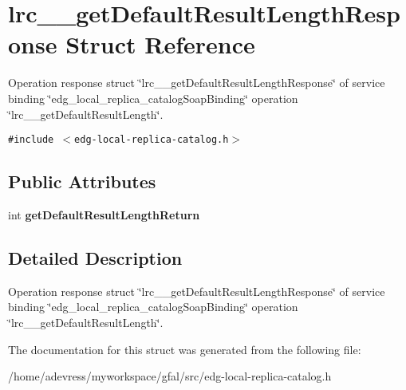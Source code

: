 \section{lrc\_\-\_\-get\-Default\-Result\-Length\-Response Struct Reference}
\label{structlrc____getDefaultResultLengthResponse}
Operation response struct \char`\"{}lrc\_\-\_\-get\-Default\-Result\-Length\-Response\char`\"{} of service binding \char`\"{}edg\_\-local\_\-replica\_\-catalog\-Soap\-Binding\char`\"{} operation \char`\"{}lrc\_\-\_\-get\-Default\-Result\-Length\char`\"{}.  


{\tt \#include $<$edg-local-replica-catalog.h$>$}

\subsection*{Public Attributes}
\begin{CompactItemize}
\item 
int \textbf{get\-Default\-Result\-Length\-Return}\label{structlrc____getDefaultResultLengthResponse_3350f2fbd529226d78336e9c9db78a46}

\end{CompactItemize}


\subsection{Detailed Description}
Operation response struct \char`\"{}lrc\_\-\_\-get\-Default\-Result\-Length\-Response\char`\"{} of service binding \char`\"{}edg\_\-local\_\-replica\_\-catalog\-Soap\-Binding\char`\"{} operation \char`\"{}lrc\_\-\_\-get\-Default\-Result\-Length\char`\"{}. 



The documentation for this struct was generated from the following file:\begin{CompactItemize}
\item 
/home/adevress/myworkspace/gfal/src/edg-local-replica-catalog.h\end{CompactItemize}
